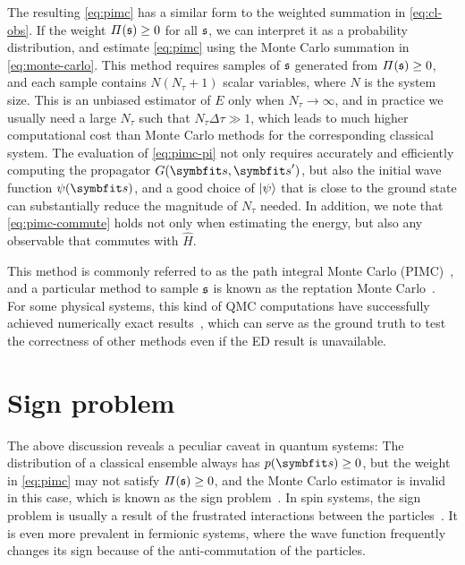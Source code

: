 The resulting \cref{eq:pimc} has a similar form to the weighted summation in \cref{eq:cl-obs}. If the weight $\varPi(\mathfrak{s}) \ge 0$ for all $\mathfrak{s}$, we can interpret it as a probability distribution, and estimate \cref{eq:pimc} using the Monte Carlo summation in \cref{eq:monte-carlo}. This method requires samples of $\mathfrak{s}$ generated from $\varPi(\mathfrak{s}) \ge 0$, and each sample contains $N (N_\tau + 1)$ scalar variables, where $N$ is the system size. This is an unbiased estimator of $E$ only when $N_\tau \to \infty$, and in practice we usually need a large $N_\tau$ such that $N_\tau \Delta \tau \gg 1$, which leads to much higher computational cost than Monte Carlo methods for the corresponding classical system. The evaluation of \cref{eq:pimc-pi} not only requires  accurately and efficiently computing the propagator $G(\vs, \vs')$, but also the initial wave function $\psi(\vs)$, and a good choice of $\ket{\psi}$ that is close to the ground state can substantially reduce the magnitude of $N_\tau$ needed. In addition, we note that \cref{eq:pimc-commute} holds not only when estimating the energy, but also any observable that commutes with $\hat{H}$.

This method is commonly referred to as the path integral Monte Carlo (PIMC)~\cite{barker1979quantum, raedt1985monte}, and a particular method to sample $\mathfrak{s}$ is known as the reptation Monte Carlo~\cite{baroni1999reptation}. For some physical systems, this kind of QMC computations have successfully achieved numerically exact results~\cite{sandvik1997finite, todo2001cluster}, which can serve as the ground truth to test the correctness of other methods even if the ED result is unavailable.

\section{Sign problem}
\label{sec:sign-problem}

The above discussion reveals a peculiar caveat in quantum systems: The distribution of a classical ensemble always has $p(\vs) \ge 0$, but the weight in \cref{eq:pimc} may not satisfy $\varPi(\mathfrak{s}) \ge 0$, and the Monte Carlo estimator is invalid in this case, which is known as the sign problem~\cite{loh1990sign}. In spin systems, the sign problem is usually a result of the frustrated interactions between the particles~\cite{henelius2000sign}. It is even more prevalent in fermionic systems, where the wave function frequently changes its sign because of the anti-commutation of the particles.

